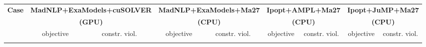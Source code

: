 \documentclass{standalone}
\begin{document}
\centering
\begin{tabular}{|l|cc|cc|cc|cc|}
  \hline
  \multirow{3}{*}{\textbf{Case}}
  & \multicolumn{2}{c|}{\textbf{MadNLP+ExaModels+cuSOLVER}}
  & \multicolumn{2}{c|}{\textbf{MadNLP+ExaModels+Ma27}}
  & \multicolumn{2}{c|}{\textbf{Ipopt+AMPL+Ma27}}
  & \multicolumn{2}{c|}{\textbf{Ipopt+JuMP+Ma27}}\\
  &\multicolumn{2}{c|}{\textbf{(GPU)}} &\multicolumn{2}{c|}{\textbf{(CPU)}} &\multicolumn{2}{c|}{\textbf{(CPU)}}&\multicolumn{2}{c|}{\textbf{(CPU)}}
  \\
  \cline{2-9}
  & objective & constr. viol.
  & objective & constr. viol.
  & objective & constr. viol.
  & objective & constr. viol.
  \\
  \\
  \hline
\end{tabular}
\end{document}
